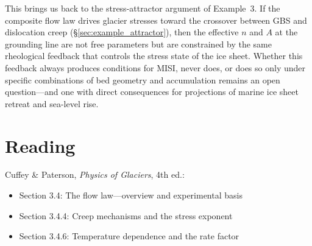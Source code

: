 \documentclass[11pt]{article}
\begin{document}
\medskip
\noindent This brings us back to the stress-attractor argument of Example~3.  If the composite flow law drives glacier stresses toward the crossover between GBS and dislocation creep (\S\ref{sec:example_attractor}), then the effective $n$ and $A$ at the grounding line are not free parameters but are constrained by the same rheological feedback that controls the stress state of the ice sheet.  Whether this feedback always produces conditions for MISI, never does, or does so only under specific combinations of bed geometry and accumulation remains an open question---and one with direct consequences for projections of marine ice sheet retreat and sea-level rise.

\clearpage
\section*{Reading}

Cuffey \& Paterson, \textit{Physics of Glaciers}, 4th ed.:
\begin{itemize}
  \item Section 3.4: The flow law---overview and experimental basis
  \item Section 3.4.4: Creep mechanisms and the stress exponent
  \item Section 3.4.6: Temperature dependence and the rate factor
\end{itemize}



\end{document}
